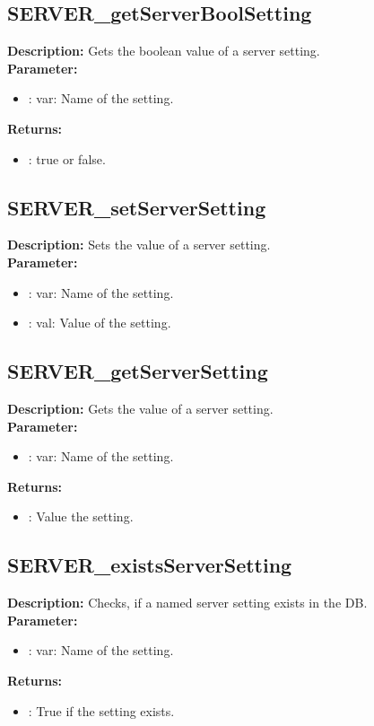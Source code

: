 \subsection{SERVER\_getServerBoolSetting}
\textbf{Description:} Gets the boolean value of a server setting.\\
\textbf{Parameter:}
\begin{itemize}
\item : var: Name of the setting.
\end{itemize}
\textbf{Returns:}
\begin{itemize}
\item : true or false.
\end{itemize}

\subsection{SERVER\_setServerSetting}
\textbf{Description:} Sets the value of a server setting.\\
\textbf{Parameter:}
\begin{itemize}
\item : var: Name of the setting.
\item : val: Value of the setting.
\end{itemize}

\subsection{SERVER\_getServerSetting}
\textbf{Description:} Gets the value of a server setting.\\
\textbf{Parameter:}
\begin{itemize}
\item : var: Name of the setting.
\end{itemize}
\textbf{Returns:}
\begin{itemize}
\item : Value the setting.
\end{itemize}

\subsection{SERVER\_existsServerSetting}
\textbf{Description:} Checks, if a named server setting exists in the DB.\\
\textbf{Parameter:}
\begin{itemize}
\item : var: Name of the setting.
\end{itemize}
\textbf{Returns:}
\begin{itemize}
\item : True if the setting exists.
\end{itemize}

